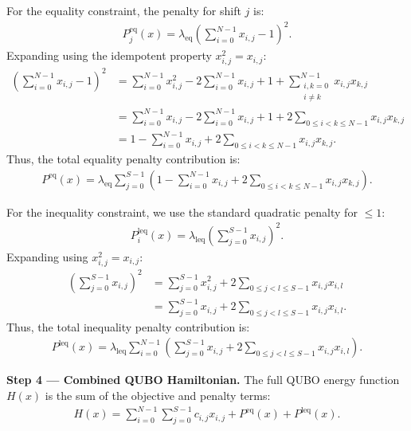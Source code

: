 \documentclass[12pt]{article}
\begin{document}
For the equality constraint, the penalty for shift $j$ is:
\begin{align}
P_j^{\text{eq}}(x) = \lambda_{\text{eq}} \left( \sum_{i=0}^{N-1} x_{i,j} - 1 \right)^2.
\end{align}
Expanding using the idempotent property $x_{i,j}^2 = x_{i,j}$:
\begin{align}
\left( \sum_{i=0}^{N-1} x_{i,j} - 1 \right)^2 &= \sum_{i=0}^{N-1} x_{i,j}^2 - 2 \sum_{i=0}^{N-1} x_{i,j} + 1 + \sum_{\substack{i,k=0 \\ i \neq k}}^{N-1} x_{i,j} x_{k,j} \nonumber \\
&= \sum_{i=0}^{N-1} x_{i,j} - 2 \sum_{i=0}^{N-1} x_{i,j} + 1 + 2 \sum_{0 \le i < k \le N-1} x_{i,j} x_{k,j} \nonumber \\
&= 1 - \sum_{i=0}^{N-1} x_{i,j} + 2 \sum_{0 \le i < k \le N-1} x_{i,j} x_{k,j}.
\end{align}
Thus, the total equality penalty contribution is:
\begin{align}
P^{\text{eq}}(x) = \lambda_{\text{eq}} \sum_{j=0}^{S-1} \left( 1 - \sum_{i=0}^{N-1} x_{i,j} + 2 \sum_{0 \le i < k \le N-1} x_{i,j} x_{k,j} \right).
\end{align}

For the inequality constraint, we use the standard quadratic penalty for $\le 1$:
\begin{align}
P_i^{\text{leq}}(x) = \lambda_{\text{leq}} \left( \sum_{j=0}^{S-1} x_{i,j} \right)^2.
\end{align}
Expanding using $x_{i,j}^2 = x_{i,j}$:
\begin{align}
\left( \sum_{j=0}^{S-1} x_{i,j} \right)^2 &= \sum_{j=0}^{S-1} x_{i,j}^2 + 2 \sum_{0 \le j < l \le S-1} x_{i,j} x_{i,l} \nonumber \\
&= \sum_{j=0}^{S-1} x_{i,j} + 2 \sum_{0 \le j < l \le S-1} x_{i,j} x_{i,l}.
\end{align}
Thus, the total inequality penalty contribution is:
\begin{align}
P^{\text{leq}}(x) = \lambda_{\text{leq}} \sum_{i=0}^{N-1} \left( \sum_{j=0}^{S-1} x_{i,j} + 2 \sum_{0 \le j < l \le S-1} x_{i,j} x_{i,l} \right).
\end{align}

\textbf{Step 4 --- Combined QUBO Hamiltonian.}
The full QUBO energy function $H(x)$ is the sum of the objective and penalty terms:
\begin{align}
H(x) = \sum_{i=0}^{N-1} \sum_{j=0}^{S-1} c_{i,j} x_{i,j} + P^{\text{eq}}(x) + P^{\text{leq}}(x).
\end{align}
\end{document}

